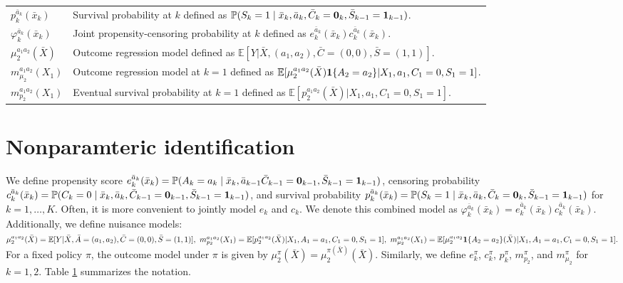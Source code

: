 \documentclass{article}
\newcommand{\pk}{{\varphi}}
\newcommand{\pr}{\mathbb{P}}
\newcommand{\E}{\mathbb{E}}
\begin{document}
\begin{table}[]
{\begin{tabular}{ll}
$p_k^{\bar a_k}(\bar x_k)$   & Survival probability at $k$ defined as $\pr(S_k=1 \mid \bar x_k, \bar a_k, \bar C_k={\bf0}_k, \bar S_{k-1}={\bf1}_{k-1})$.                                        \\
${\pk}_k^{\bar a_k}(\bar x_k)$ & Joint propensity-censoring probability at $k$ defined as $e_k^{\bar a_k}(\bar x_k)c_k^{\bar a_k}(\bar x_k)$. \\
$\mu_2^{a_1a_2}(\bar X)$     & Outcome regression model defined as $\E[ Y | \bar X, (a_1,a_2), \bar C = (0,0), \bar S = (1,1) ]$.                                                                \\
$m_{\mu_2}^{a_1a_2}(X_1)$    & Outcome regression model at $k=1$ defined as $\E[ \mu_2^{a_1a_2}(\bar X){\bf1}\{A_2=a_2\} | X_1, a_1, C_1=0, S_1=1 ]$.                           \\
$m_{p_2}^{a_1a_2}(X_1)$      & Eventual survival probability at $k=1$ defined as $\E[ p_2^{a_1a_2}(\bar X) | X_1, a_1, C_1=0, S_1=1 ]$.                                                          \\ %
\end{tabular}}
\label{table:notation}
\end{table}



%
%
\section{Nonparamteric identification}
We define propensity score $e^{\bar a_k}_k(\bar x_k) = \pr(A_k=a_k \mid \bar x_k, \bar a_{k-1} \bar C_{k-1}={\bf0}_{k-1}, \bar S_{k-1}={\bf1}_{k-1})$, censoring probability $c^{\bar a_k}_k(\bar x_k) = \pr(C_k=0 \mid \bar x_k, \bar a_k, \bar C_{k-1}={\bf0}_{k-1}, \bar S_{k-1}={\bf1}_{k-1})$, and survival probability $p_k^{\bar a_k}(\bar x_k) = \pr(S_k=1 \mid \bar x_k, \bar a_k, \bar C_k={\bf0}_k, \bar S_{k-1}={\bf1}_{k-1})$ for $k=1,\dots,K$.
Often, it is more convenient to jointly model $e_k$ and $c_k$. We denote this combined model as ${\pk}_k^{\bar a_k}(\bar x_k) = e_k^{\bar a_k}(\bar x_k) c_k^{\bar a_k}(\bar x_k)$.
Additionally, we define nuisance models: 
$\mu_2^{a_1a_2}(\bar X) = \E[ Y | \bar X, \bar A = (a_1,a_2), \bar C = (0,0), \bar S = (1,1) ], ~
m_{p_2}^{a_1a_2}(X_1) = \E[ p_2^{a_1a_2}(\bar X) | X_1, A_1=a_1, C_1=0, S_1=1 ], ~
m_{\mu_2}^{a_1a_2}(X_1) = \E[ \mu_2^{a_1a_2}{\bf1}\{A_2=a_2\}(\bar X) 
    | X_1, A_1=a_1, C_1=0, S_1=1 ].$
For a fixed policy \(\pi\), the outcome model under $\pi$ is given by $\mu_2^\pi(\bar{X}) = \mu_2^{\pi(\bar X)}(\bar{X})$. Similarly, we define $e_k^{\pi}$, $c_k^{\pi}$, $p_k^{\pi}$, $m_{p_2}^\pi$, and $m_{\mu_2}^\pi$ for $k = 1, 2$. Table \ref{table:notation} summarizes the notation.
\end{document}
